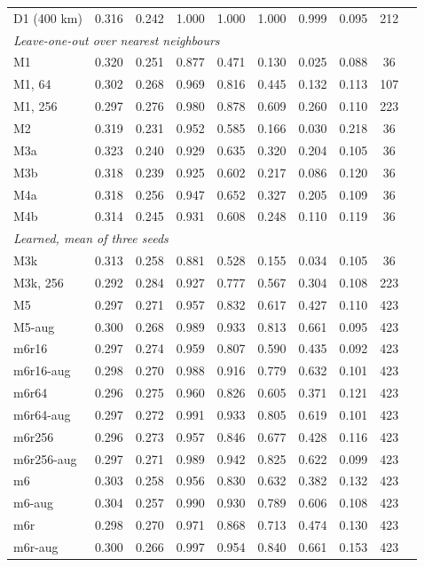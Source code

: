 \documentclass[preprint,12pt,authoryear]{elsarticle}
\begin{document}
\begin{table}[tbp]
\begin{tabular}{lccccccccc}
    D1 (400 km) & 0.316 & 0.242 & 1.000 & 1.000 & 1.000 & 0.999 & 0.095 & 212 \\
    \multicolumn{9}{l}{\textit{Leave-one-out over nearest neighbours}} \\
    M1 & 0.320 & 0.251 & 0.877 & 0.471 & 0.130 & 0.025 & 0.088 & 36 \\
    M1, 64 & 0.302 & 0.268 & 0.969 & 0.816 & 0.445 & 0.132 & 0.113 & 107 \\
    M1, 256 & 0.297 & 0.276 & 0.980 & 0.878 & 0.609 & 0.260 & 0.110 & 223 \\
    M2 & 0.319 & 0.231 & 0.952 & 0.585 & 0.166 & 0.030 & 0.218 & 36 \\
    M3a & 0.323 & 0.240 & 0.929 & 0.635 & 0.320 & 0.204 & 0.105 & 36 \\
    M3b & 0.318 & 0.239 & 0.925 & 0.602 & 0.217 & 0.086 & 0.120 & 36 \\
    M4a & 0.318 & 0.256 & 0.947 & 0.652 & 0.327 & 0.205 & 0.109 & 36 \\
    M4b & 0.314 & 0.245 & 0.931 & 0.608 & 0.248 & 0.110 & 0.119 & 36 \\
    \multicolumn{9}{l}{\textit{Learned, mean of three seeds}} \\
    M3k & 0.313 & 0.258 & 0.881 & 0.528 & 0.155 & 0.034 & 0.105 & 36 \\
    M3k, 256 & 0.292 & 0.284 & 0.927 & 0.777 & 0.567 & 0.304 & 0.108 & 223 \\
    M5 & 0.297 & 0.271 & 0.957 & 0.832 & 0.617 & 0.427 & 0.110 & 423 \\
    M5-aug & 0.300 & 0.268 & 0.989 & 0.933 & 0.813 & 0.661 & 0.095 & 423 \\
    m6r16 & 0.297 & 0.274 & 0.959 & 0.807 & 0.590 & 0.435 & 0.092 & 423 \\
    m6r16-aug & 0.298 & 0.270 & 0.988 & 0.916 & 0.779 & 0.632 & 0.101 & 423 \\
    m6r64 & 0.296 & 0.275 & 0.960 & 0.826 & 0.605 & 0.371 & 0.121 & 423 \\
    m6r64-aug & 0.297 & 0.272 & 0.991 & 0.933 & 0.805 & 0.619 & 0.101 & 423 \\
    m6r256 & 0.296 & 0.273 & 0.957 & 0.846 & 0.677 & 0.428 & 0.116 & 423 \\
    m6r256-aug & 0.297 & 0.271 & 0.989 & 0.942 & 0.825 & 0.622 & 0.099 & 423 \\
    m6 & 0.303 & 0.258 & 0.956 & 0.830 & 0.632 & 0.382 & 0.132 & 423 \\
    m6-aug & 0.304 & 0.257 & 0.990 & 0.930 & 0.789 & 0.606 & 0.108 & 423 \\
    m6r & 0.298 & 0.270 & 0.971 & 0.868 & 0.713 & 0.474 & 0.130 & 423 \\
    m6r-aug & 0.300 & 0.266 & 0.997 & 0.954 & 0.840 & 0.661 & 0.153 & 423 \\
    \bottomrule
  \end{tabular}
\end{table}
\end{document}
